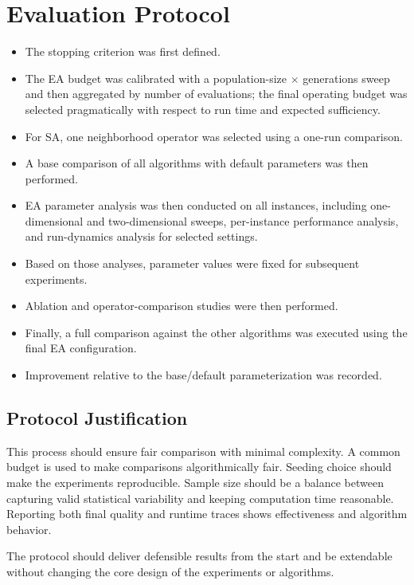 \documentclass[12pt,a4paper]{report}
\begin{document}
\section{Evaluation Protocol}

\begin{itemize}
    \item The stopping criterion was first defined.
    \item The EA budget was calibrated with a population-size \(\times\) generations sweep and then aggregated by number of evaluations; the final operating budget was selected pragmatically with respect to run time and expected sufficiency.
    \item For SA, one neighborhood operator was selected using a one-run comparison.
    \item A base comparison of all algorithms with default parameters was then performed.
    \item EA parameter analysis was then conducted on all instances, including one-dimensional and two-dimensional sweeps, per-instance performance analysis, and run-dynamics analysis for selected settings.
    \item Based on those analyses, parameter values were fixed for subsequent experiments.
    \item Ablation and operator-comparison studies were then performed.
    \item Finally, a full comparison against the other algorithms was executed using the final EA configuration.
    \item Improvement relative to the base/default parameterization was recorded.
\end{itemize}


\subsection{Protocol Justification}
This process should ensure fair comparison with minimal complexity. A common budget is used to make comparisons algorithmically fair. Seeding choice should make the experiments reproducible. Sample size should be a balance between capturing valid statistical variability and keeping computation time reasonable. Reporting both final quality and runtime traces shows effectiveness and algorithm behavior.

The protocol should deliver defensible results from the start and be extendable without changing the core design of the experiments or algorithms.
\end{document}
